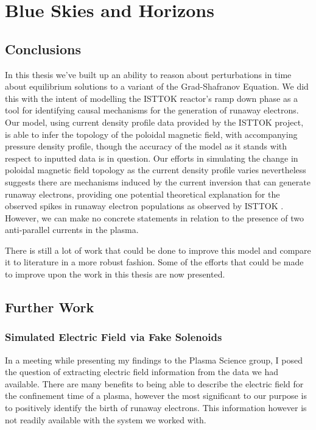 
\chapter{Blue Skies and Horizons}
\label{chapter6}

\section{Conclusions}

In this thesis we've built up an ability to reason about perturbations in time about 
equilibrium solutions to a variant of the Grad-Shafranov Equation. We did this with the intent 
of modelling the ISTTOK reactor's ramp down phase as a tool for identifying 
causal mechanisms for the generation of runaway electrons. Our model, using current 
density profile data provided by the ISTTOK project, is able to infer the topology 
of the poloidal magnetic field, with accompanying pressure density profile, though the 
accuracy of the model as it stands with respect to inputted data is in question. Our 
efforts in simulating the change in poloidal magnetic field topology as the current 
density profile varies nevertheless suggests there are mechanisms induced by the current inversion 
that can generate runaway electrons, providing one potential theoretical explanation 
for the observed spikes in runaway electron populations as observed by ISTTOK \cite{malaquias-matthew}.
However, we can make no concrete statements in relation to the presence of two anti-parallel 
currents in the plasma. 

There is still a lot of work that could be done to improve this 
model and compare it to literature in a more robust fashion. Some of the efforts that 
could be made to improve upon the work in this thesis are now presented.

\section{Further Work}

\subsection{Simulated Electric Field via Fake Solenoids}

In a meeting while presenting my findings to the Plasma Science group, I 
posed the question of extracting electric field information from the data 
we had available. There are many benefits to being able to describe the 
electric field for the confinement time of a plasma, however the 
most significant to our purpose is to positively identify the 
birth of runaway electrons. This information however is not readily 
available with the system we worked with.

